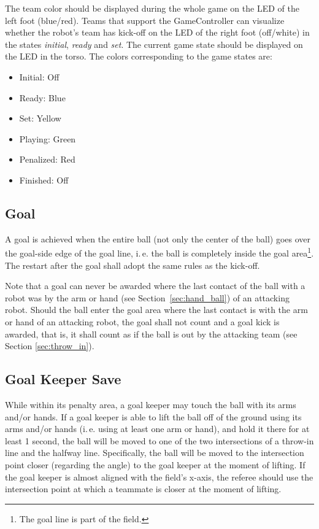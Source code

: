 \documentclass[12pt]{article}
\newcommand{\ie}{\mbox{i.\,e.}\xspace}
\begin{document}
The team color should be displayed during the whole game on the LED of the left foot (blue/red). Teams that support the GameController can visualize whether the robot's team has kick-off on the LED of the right foot (off/white) in the states \emph{initial}, \emph{ready} and \emph{set}. The current game state should be displayed on the LED in the torso. The colors corresponding to the game states are:

\begin{itemize}

\item Initial: Off

\item Ready: Blue

\item Set: Yellow

\item Playing: Green

\item Penalized: Red

\item Finished: Off

\end{itemize}

\subsection{Goal}

A goal is achieved when the entire ball (not only the center of the ball) goes over the goal-side edge of the goal line, \ie the ball is completely inside the goal area\footnote{The goal line is part of the field.}. The restart after the goal shall adopt the same rules as the kick-off.

Note that a goal can never be awarded where the last contact of the ball with a robot was by the arm or hand (see Section~\ref{sec:hand_ball}) of an attacking robot. Should the ball enter the goal area where the last contact is with the arm or hand of an attacking robot, the goal shall not count and a goal kick is awarded, that is, it shall count as if the ball is out by the attacking team (see Section \ref{sec:throw_in}).

\subsection{Goal Keeper Save}
\label{sec:goalie_save}
While within its penalty area, a goal keeper may touch the ball with its arms and/or hands.  If a goal keeper is able to lift the ball off of the ground using its arms and/or hands (\ie using at least one arm or hand), and hold it there for at least 1 second, the ball will be moved to one of the two intersections of a throw-in line and the halfway line. Specifically, the ball will be moved to the intersection point closer (regarding the angle) to the goal keeper at the moment of lifting. If the goal keeper is almost aligned with the field's x-axis, the referee should use the intersection point at which a teammate is closer at the moment of lifting.
\end{document}
